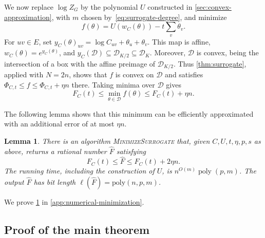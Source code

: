 \documentclass[11pt,reqno,letterpaper]{amsart}
\numberwithin{equation}{section}
\newtheorem{lemma}[lemma]{Lemma}
\theoremstyle{definition}
\theoremstyle{remark}
\newcommand{\cD}{\mathcal D}
\begin{document}
We now replace $\log Z_G$ by the polynomial $U$ constructed in
\cref{sec:convex-approximation}, with $m$ chosen by~\cref{eq:surrogate-degree},
and minimize
\begin{equation*}
 f(\theta)=U(w_C(\theta))-t\sum_v\theta_v.
\end{equation*}
For $uv\in E$, set
$y_C(\theta)_{uv}=\log C_{uv}+\theta_u+\theta_v$.
This map is affine, $w_C(\theta)=e^{y_C(\theta)}$, and
$y_C(\mathcal D)\subseteq\cD_{K/2}\subseteq\cD_K$.
Moreover, $\mathcal D$ is convex, being the intersection of a box
with the affine preimage of $\cD_{K/2}$.
Thus \cref{thm:surrogate}, applied with $N=2n$, shows that $f$ is
convex on $\mathcal D$ and satisfies
$\Phi_{C,t}\le f\le\Phi_{C,t}+\eta n$ there.
Taking minima over $\mathcal{D}$ gives
\begin{equation}\label{eq:surrogate-minimum}
 F_C(t)\le\min_{\theta\in\mathcal{D}}f(\theta)\le F_C(t)+\eta n.
\end{equation}

The following lemma shows that this minimum can be efficiently
approximated with an additional error of at most $\eta n$.

\begin{lemma}\label{lem:optimization}
There is an algorithm \emph{\textsc{MinimizeSurrogate}} that,
given $C,U,t,\eta,p,s$ as above, returns a rational number
$\widehat F$ satisfying
\begin{equation*}
 F_C(t)\le\widehat F\le F_C(t)+2\eta n.
\end{equation*}
The running time, including the construction of $U$, is
$n^{O(m)}\operatorname{poly}(p,m)$. The output $\widehat F$ has bit length $\ell(\widehat F)=\mathrm{poly}(n,p,m)$.
\end{lemma}

We prove \cref{lem:optimization} in \cref{app:numerical-minimization}.

\subsection{Proof of the main theorem}
\end{document}
